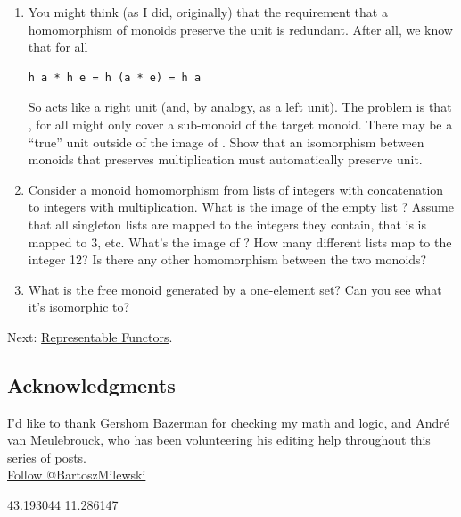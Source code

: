 \begin{enumerate}
\item
  You might think (as I did, originally) that the requirement that a
  homomorphism of monoids preserve the unit is redundant. After all, we
  know that for all 

\begin{verbatim}
h a * h e = h (a * e) = h a
\end{verbatim}

  So  acts like a right unit (and, by analogy, as a left
  unit). The problem is that , for all  might
  only cover a sub-monoid of the target monoid. There may be a ``true''
  unit outside of the image of . Show that an isomorphism
  between monoids that preserves multiplication must automatically
  preserve unit.
\item
  Consider a monoid homomorphism from lists of integers with
  concatenation to integers with multiplication. What is the image of
  the empty list \code{{[}{]}}? Assume that all singleton lists are
  mapped to the integers they contain, that is \code{{[}3{]}} is
  mapped to 3, etc. What's the image of \code{{[}1,\ 2,\ 3,\ 4{]}}?
  How many different lists map to the integer 12? Is there any other
  homomorphism between the two monoids?
\item
  What is the free monoid generated by a one-element set? Can you see
  what it's isomorphic to?
\end{enumerate}

Next:
\href{https://bartoszmilewski.com/2015/07/29/representable-functors/}{Representable
Functors}.

\subsection{Acknowledgments}\label{acknowledgments}

I'd like to thank Gershom Bazerman for checking my math and logic, and
André van Meulebrouck, who has been volunteering his editing help
throughout this series of posts.\\
\href{https://twitter.com/BartoszMilewski}{Follow @BartoszMilewski}

{43.193044} {11.286147}

